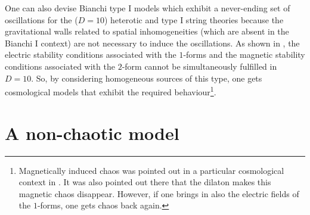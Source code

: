 \documentclass[a4paper,12pt]{article}
\begin{document}
One can also devise Bianchi type I models which exhibit
a never-ending set of oscillations for the ($D = 10$) heterotic and
type I string theories because the gravitational walls
related to spatial inhomogeneities (which are absent in
the Bianchi I context) are not necessary to induce the oscillations.
As shown in \cite{dh2}, the electric stability conditions associated with
the $1$-forms and the magnetic stability conditions associated
with the $2$-form cannot be simultaneously fulfilled in $D=10$.
So, by considering homogeneous sources
of this type, one gets cosmological models that exhibit the required
behaviour\footnote{Magnetically induced chaos was pointed out in a particular
cosmological context in \cite{Moorhouse}.  It was
also pointed out there that the dilaton makes this magnetic chaos
disappear.  However, if one brings in also the electric fields of
the $1$-forms, one gets chaos back again.}.


\section{A non-chaotic model}
\end{document}
